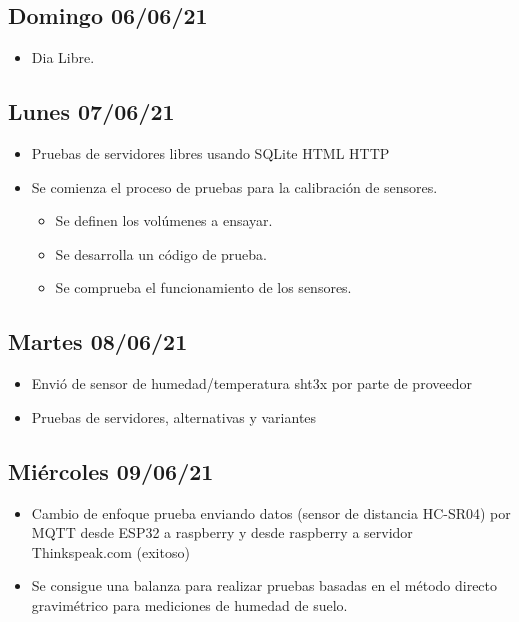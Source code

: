 \subsection*{Domingo 06/06/21}
    \begin{itemize}
        \item Dia Libre.
    \end{itemize}
\subsection*{Lunes 07/06/21}
    \begin{itemize}
        \item Pruebas de servidores libres usando SQLite HTML HTTP 
        \item Se comienza el proceso de pruebas para la calibración de sensores.
        \begin{itemize}
            \item Se definen los volúmenes a ensayar.
            \item Se desarrolla un código de prueba.
            \item Se comprueba el funcionamiento de los sensores.
        \end{itemize}
    \end{itemize}
\subsection*{Martes 08/06/21}
    \begin{itemize}
        \item Envió de sensor de humedad/temperatura sht3x por parte de proveedor
        \item Pruebas de servidores, alternativas y variantes
    \end{itemize}

\subsection*{Miércoles 09/06/21}
    \begin{itemize}
        \item Cambio de enfoque prueba enviando datos (sensor de distancia HC-SR04) por MQTT desde ESP32 a raspberry y desde raspberry a servidor Thinkspeak.com (exitoso)
        \item Se consigue una balanza para realizar pruebas basadas en el método directo gravimétrico para mediciones de humedad de suelo.
    \end{itemize}
    
